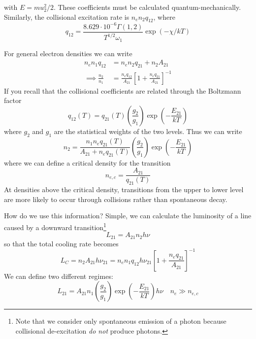 with $E = mu_{2}^{2}/2$. These coefficients must be calculated quantum-mechanically. Similarly, the collisional excitation rate is $n_{e}n_{2}q_{12}$, where 
\begin{equation*}
    q_{12} = \frac{8.629\cdot 10^{-6}\Gamma(1,2)}{T^{1/2}\omega_{1}}\exp(-\chi/kT)
\end{equation*}
\par For general electron densities we can write 
\begin{align*}
    n_{e}n_{1}q_{12} &= n_{e}n_{2}q_{21}+n_{2}A_{21}\\
    \implies \frac{n_{2}}{n_{1}} &= \frac{n_{e}q_{12}}{A_{21}}\left[1+\frac{n_{e}q_{21}}{A_{21}}\right]^{-1}
\end{align*}
If you recall that the collisional coefficients are related through the Boltzmann factor
\begin{equation*}
    q_{12}(T) = q_{21}(T)\left(\frac{g_{2}}{g_{1}}\right)\exp\left(-\frac{E_{21}}{kT}\right)
\end{equation*}
where $g_{2}$ and $g_{1}$ are the statistical weights of the two levels. Thus we can write 
\begin{equation*}
    n_{2} = \frac{n_{1}n_{e}q_{21}(T)}{A_{21}+n_{e}q_{21}(T)}\left(\frac{g_{2}}{g_{1}}\right)\exp\left(-\frac{E_{21}}{kT}\right)
\end{equation*}
where we can define a critical density for the transition 
\begin{equation}
    n_{e,c} = \frac{A_{21}}{q_{21}(T)}
    \label{eq:criticaldensity}
\end{equation}
At densities above the critical density, transitions from the upper to lower level are more likely to occur through collisions rather than spontaneous decay.
\par How do we use this information? Simple, we can calculate the luminosity of a line caused by a downward transition\footnote{Note that we consider only spontaneous emission of a photon because collisional de-excitation \emph{do not} produce photons.}
\begin{equation*}
    L_{21} = A_{21}n_{2}h\nu
\end{equation*}
so that the total cooling rate becomes 
\begin{equation}
    L_{C} = n_{2}A_{21}h\nu_{21} = n_{e}n_{1}q_{12}h\nu_{21}\left[1+\frac{n_{e}q_{21}}{A_{21}}\right]^{-1}
    \label{eq:total_collision_luminosity}
\end{equation}
We can define two different regimes:
\begin{equation*}
    L_{21} = A_{21}n_{1}\left(\frac{g_{2}}{g_{1}}\right)\exp\left(-\frac{E_{21}}{kT}\right)h\nu \quad n_{e} \gg n_{e,c}
\end{equation*}

